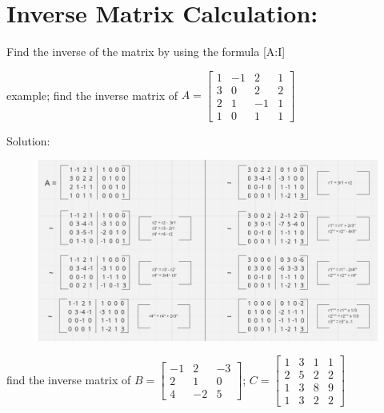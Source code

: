 \documentclass{article}
\begin{document}
    \newpage
    \section*{Inverse Matrix Calculation:}
    \vspace{10pt}
    Find the inverse of the matrix by using the formula [A:I]

    \vspace{10pt}
    example; find the inverse matrix of \( A = \begin{bmatrix} 1 & -1 & 2 & 1 \\ 3 & 0 & 2 & 2 \\ 2 & 1 & -1 & 1 \\ 1 & 0 & 1 & 1 \end{bmatrix} \)

    \vspace{10pt}
    Solution:
    \vspace{10pt}
    \begin{figure}[htbp]
        \centering
        \includegraphics[width=1.2\textwidth, height=.7\textheight]{../asset/invEXA.png}        \label{fig:example}
    \end{figure}

    \vspace{10pt}
    \newpage

    find the inverse matrix of
    \hspace*{10pt}
    \( B = \begin{bmatrix} -1 & 2 & -3 \\ 2 & 1 & 0 \\ 4 & -2 & 5 \end{bmatrix} \);  
    \( C = \begin{bmatrix} 1 & 3 & 1 & 1 \\ 2 & 5 & 2 & 2 \\ 1 & 3 & 8 & 9 \\ 1 & 3 & 2 & 2 \end{bmatrix} \)
    
\end{document}
